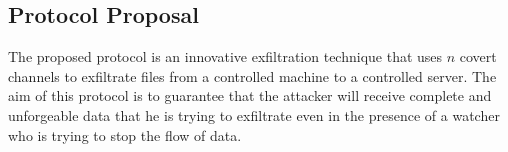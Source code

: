 \documentclass[main.tex]{subfiles}
\begin{document}
\subsection{Protocol Proposal}
The proposed protocol is an innovative exfiltration technique that uses $n$ covert channels to exfiltrate files from a controlled machine to a controlled server. The aim of this protocol is to guarantee that the attacker will receive complete and unforgeable data that he is trying to exfiltrate even in the presence of a watcher who is trying to stop the flow of data.
\end{document}
